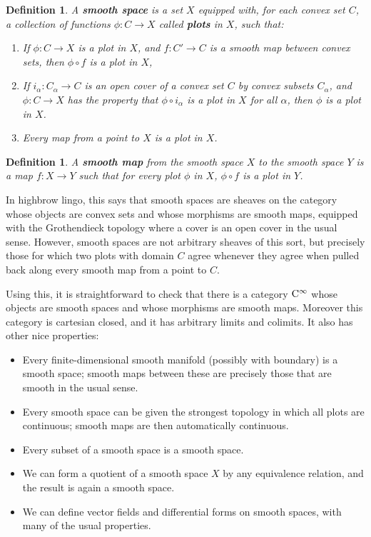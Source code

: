 \documentclass{article}
\newcommand{\maps}{\colon}
\newtheorem{definition}[theorem]{Definition}
\newcommand{\et}{\hspace{-0.08in}{\bf .}\hspace{0.1in}}
\begin{document}
\begin{definition} \et
\label{smooth_space} 
A {\bf smooth space} is a set $X$ equipped with, for 
each convex set $C$, a collection of functions 
$\phi \maps C \to X$ called {\bf plots} in $X$, such that:
\begin{enumerate} 
\item 
If $\phi \maps C \to X$ is a plot in $X$, 
and $f \maps C' \to C$ is a smooth map between convex sets, 
then $\phi \circ f$ is a plot in $X$,
\item
If $i_\alpha \maps C_\alpha \to C$ is an open cover of a convex
set $C$ by convex subsets $C_\alpha$,
and $\phi \maps C \to X$ has the property that $\phi \circ i_\alpha$ 
is a plot in $X$ for all $\alpha$, then $\phi$ is a plot in $X$.
\item 
Every map from a point to $X$ is a plot in $X$.
\end{enumerate}
\end{definition}

\begin{definition} \et
\label{smooth_map} 
A {\bf smooth map} from the smooth space $X$ to the smooth
space $Y$ is a map $f \maps X \to Y$ such that for every
plot $\phi$ in $X$, $\phi \circ f$ is a plot in $Y$.
\end{definition}

\noindent
In highbrow lingo, this says that smooth spaces are sheaves
on the category whose objects are convex sets and whose morphisms are
smooth maps, equipped with the Grothendieck topology where a cover
is an open cover in the usual sense.  However, smooth spaces are
not arbitrary sheaves of this sort, but precisely those 
for which two plots with domain $C$ agree whenever they agree
when pulled back along every smooth map from a point to $C$.

Using this, it is straightforward to check that there is a category 
${\rm C}^\infty$ whose objects are smooth spaces and whose morphisms
are smooth maps.  Moreover this category is cartesian closed, and 
it has arbitrary limits and colimits.  It also has other nice properties:

\begin{itemize}
\item  Every finite-dimensional smooth manifold (possibly with
boundary) is a smooth space;
smooth maps between these are precisely those
that are smooth in the usual sense.
\item  Every smooth space can be given the strongest topology in which
all plots are continuous; smooth maps
are then automatically continuous.
\item  Every subset of a smooth space is a smooth space.
\item  We can form a quotient of a smooth space $X$ by any
equivalence relation, and the result is again a smooth space.  
\item  We can define vector fields and differential forms on smooth 
spaces, with many of the usual properties.
\end{itemize}
\end{document}
